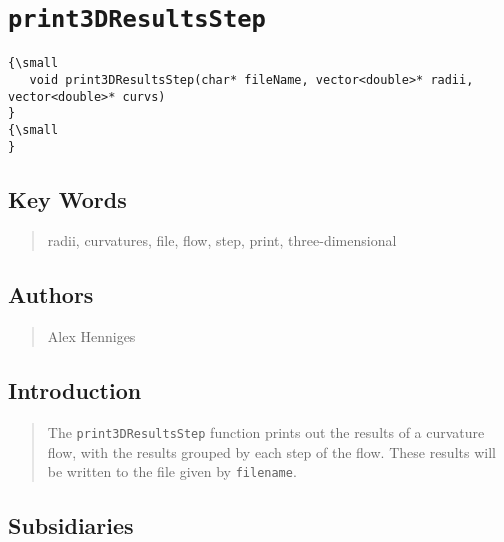                       


\section*{\texttt{print3DResultsStep}}

\label{f0}

\begin{quotation}
{\small }
\end{quotation}

\begin{verbatim}
{\small 
   void print3DResultsStep(char* fileName, vector<double>* radii, vector<double>* curvs)
}
{\small    
}
\end{verbatim}

\subsection*{Key Words}

\begin{quotation}
radii, curvatures, file, flow, step, print, three-dimensional
\end{quotation}

\subsection*{Authors}

\begin{quotation}
Alex Henniges
\end{quotation}

\subsection*{Introduction}

\begin{quotation}
The \texttt{print3DResultsStep} function prints out the results of a
curvature flow, with the results grouped by each step of the flow. These
results will be written to the file given by \texttt{filename}.
\end{quotation}

\subsection*{Subsidiaries}

